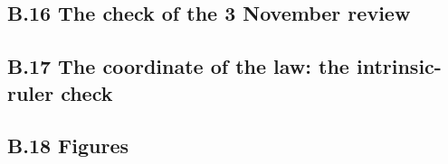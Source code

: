 \documentclass[11pt]{article}
\begin{document}
\subsection*{B.16 The check of the 3 November review}



\subsection*{B.17 The coordinate of the law: the intrinsic-ruler check}







\subsection*{B.18 Figures}





\end{document}
